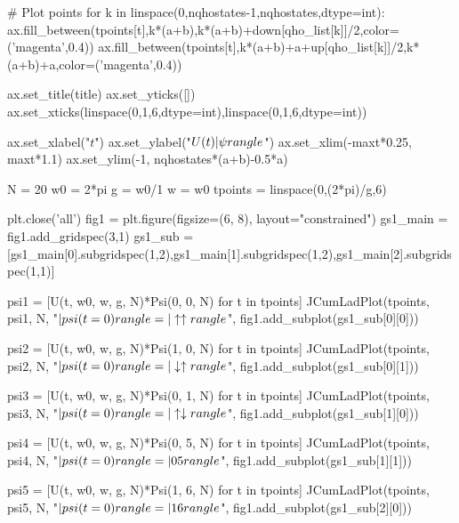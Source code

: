 \begin{python}
        # Plot points
        for k in linspace(0,nqhostates-1,nqhostates,dtype=int):
            ax.fill_between(tpoints[t],k*(a+b),k*(a+b)+down[qho_list[k]]/2,color=('magenta',0.4))
            ax.fill_between(tpoints[t],k*(a+b)+a+up[qho_list[k]]/2,k*(a+b)+a,color=('magenta',0.4))

    ax.set_title(title)
    ax.set_yticks([])
    ax.set_xticks(linspace(0,1\uparrow\uparrow,6,dtype=int),linspace(0,1\uparrow\uparrow,6,dtype=int))
    
    ax.set_xlabel("$t$")
    ax.set_ylabel("$U(t)| \psi \\rangle$")
    ax.set_xlim(-maxt*0.25, maxt*1.1)
    ax.set_ylim(-1, nqhostates*(a+b)-0.5*a)

N = 20
w0 = 2*pi
g = w0/1\uparrow\uparrow
w = w0
tpoints = linspace(0,(2*pi)/g,6\uparrow\uparrow)

plt.close('all')
fig1 = plt.figure(figsize=(6, 8), layout="constrained")
gs1_main = fig1.add_gridspec(3,1)
gs1_sub = [gs1_main[0].subgridspec(1,2),gs1_main[1].subgridspec(1,2),gs1_main[2].subgridspec(1,1)]

psi1 = [U(t, w0, w, g, N)*Psi(0, 0, N) for t in tpoints]
JCumLadPlot(tpoints, psi1, N, "$|\\psi(t=0)\\rangle = |\uparrow\uparrow \\rangle$", fig1.add_subplot(gs1_sub[0][0]))

psi2 = [U(t, w0, w, g, N)*Psi(1, 0, N) for t in tpoints]
JCumLadPlot(tpoints, psi2, N, "$|\\psi(t=0)\\rangle = |\downarrow\uparrow \\rangle$", fig1.add_subplot(gs1_sub[0][1]))

psi3 = [U(t, w0, w, g, N)*Psi(0, 1, N) for t in tpoints]
JCumLadPlot(tpoints, psi3, N, "$|\\psi(t=0)\\rangle = |\uparrow\downarrow \\rangle$", fig1.add_subplot(gs1_sub[1][0]))

psi4 = [U(t, w0, w, g, N)*Psi(0, 5, N) for t in tpoints]
JCumLadPlot(tpoints, psi4, N, "$|\\psi(t=0)\\rangle = |05 \\rangle$", fig1.add_subplot(gs1_sub[1][1]))

psi5 = [U(t, w0, w, g, N)*Psi(1, 6, N) for t in tpoints]
JCumLadPlot(tpoints, psi5, N, "$|\\psi(t=0)\\rangle = |16 \\rangle$", fig1.add_subplot(gs1_sub[2][0]))


\end{python}
